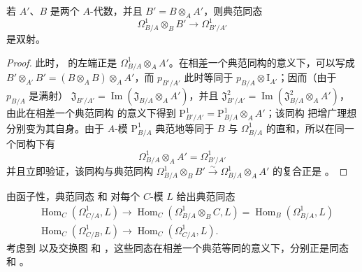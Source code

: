 \begin{proposition}[20.5.5]
\label{0.20.5.5-fr}
若 $A'$、$B$ 是两个 $A$-代数，并且 $B'=B\otimes_A A'$，则典范同态
\begin{equation}
\tag{20.5.5.1}
\label{0.20.5.5.1-fr}
  \Omega^1_{B/A}\otimes_B B'\to\Omega^1_{B'/A'}
\end{equation}
是双射。
\end{proposition}

\begin{proof}
此时， 的左端正是
$\Omega^1_{B/A}\otimes_A A'$。在相差一个典范同构的意义下，可以写成
$B'\otimes_{A'}B'=(B\otimes_A B)\otimes_A A'$，而 $p_{B'/A'}$ 此时等同于
$p_{B/A}\otimes\mathrm{I}_{A'}$；因而（由于 $p_{B/A}$ 是满射）
$\mathfrak{J}_{B'/A'}=\operatorname{Im}(\mathfrak{J}_{B/A}\otimes_A A')$，并且
$\mathfrak{J}^2_{B'/A'}
=\operatorname{Im}(\mathfrak{J}^2_{B/A}\otimes_A A')$，由此在相差一个典范同构
的意义下得到 $\mathrm{P}^1_{B'/A'}=\mathrm{P}^1_{B/A}\otimes_A A'$；该同构
把增广理想分别变为其自身。由于 $A$-模 $\mathrm{P}^1_{B/A}$ 典范地等同于
$B$ 与 $\Omega^1_{B/A}$ 的直和，所以在同一个同构下有
\begin{equation}
\tag{20.5.5.2}
\label{0.20.5.5.2-fr}
  \Omega^1_{B/A}\otimes_A A'=\Omega^1_{B'/A'}
\end{equation}
并且立即验证，该同构与典范同构
$\Omega^1_{B/A}\otimes_B B'\xrightarrow{\sim}
\Omega^1_{B/A}\otimes_A A'$ 的复合正是 。
\end{proof}

\begin{env}[20.5.6]
\label{0.20.5.6-fr}
由函子性，典范同态  和
 对每个 $C$-模 $L$ 给出典范同态
\begin{align}
\tag{20.5.6.1}
\label{0.20.5.6.1-fr}
  &\operatorname{Hom}_C(\Omega^1_{C/A},L)
  \to\operatorname{Hom}_C(\Omega^1_{B/A}\otimes_B C,L)
  =\operatorname{Hom}_B(\Omega^1_{B/A},L) \\
\tag{20.5.6.2}
\label{0.20.5.6.2-fr}
  &\operatorname{Hom}_C(\Omega^1_{C/B},L)
  \to\operatorname{Hom}_C(\Omega^1_{C/A},L).
\end{align}
考虑到  以及交换图  和
，这些同态在相差一个典范等同的意义下，分别正是同态
 和 。
\end{env}

